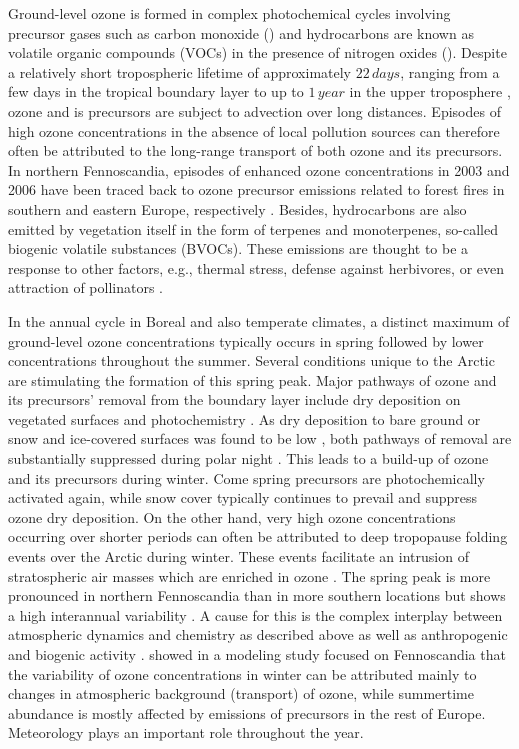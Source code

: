 \documentclass[bg, manuscript]{copernicus}
\begin{document}
Ground-level ozone is formed in complex photochemical cycles involving precursor gases such as carbon monoxide () and hydrocarbons are known as volatile organic compounds (VOCs) in the presence of nitrogen oxides (). Despite a relatively short tropospheric lifetime of approximately $22\,\unit{days}$, ranging from a few days in the tropical boundary layer to up to $1\,\unit{year}$ in the upper troposphere \citep{JGR:Stevenson2005,ACP:Young2013}, ozone and is precursors are subject to advection over long distances. Episodes of high ozone concentrations in the absence of local pollution sources can therefore often be attributed to the long-range transport of both ozone and its precursors. In northern Fennoscandia, episodes of enhanced ozone concentrations in 2003 and 2006 have been traced back to ozone precursor emissions related to forest fires in southern and eastern Europe, respectively \citep{AE:Lindskog2007,EP:Karlsson2013}. Besides, hydrocarbons are also emitted by vegetation itself in the form of terpenes and monoterpenes, so-called biogenic volatile substances (BVOCs). These emissions are thought to be a response to other factors, e.g., thermal stress, defense against herbivores, or even attraction of pollinators \citep{TPS:Penuelas2003}. 

In the annual cycle in Boreal and also temperate climates, a distinct maximum of ground-level ozone concentrations typically occurs in spring followed by lower concentrations throughout the summer. Several conditions unique to the Arctic are stimulating the formation of this spring peak. Major pathways of ozone and its precursors' removal from the boundary layer include dry deposition on vegetated surfaces and photochemistry \citep{RG:Clifton2020}. As dry deposition to bare ground or snow and ice-covered surfaces was found to be low \citep{ACP:Helmig2007}, both pathways of removal are substantially suppressed during polar night \citep{AE:Monks2000}. This leads to a build-up of ozone and its precursors during winter. Come spring precursors are photochemically activated again, while snow cover typically continues to prevail and suppress ozone dry deposition.
On the other hand, very high ozone concentrations occurring over shorter periods can often be attributed to deep tropopause folding events over the Arctic during winter. These events facilitate an intrusion of stratospheric air masses which are enriched in ozone \citep{JGR:Skerlak2015}.
The spring peak is more pronounced in northern Fennoscandia than in more southern locations but shows a  high interannual variability \citep{AB:Klingberg2009, BER:Klingberg2019}. A cause for this is the complex interplay between atmospheric dynamics and chemistry \citep{AE:Laurila1996,BER:Hatakka2003} as described above as well as anthropogenic and biogenic activity \citep{AE:Rummukainen1996,AE:Simpson2002,QJRMS:Galbally2007,NGS:Schnell2009}. \citet{ACP:Andersson2017} showed in a modeling study focused on Fennoscandia that the variability of ozone concentrations in winter can be attributed mainly to changes in atmospheric background (transport) of ozone, while summertime abundance is mostly affected by emissions of precursors in the rest of Europe. Meteorology plays an important role throughout the year.
\end{document}
